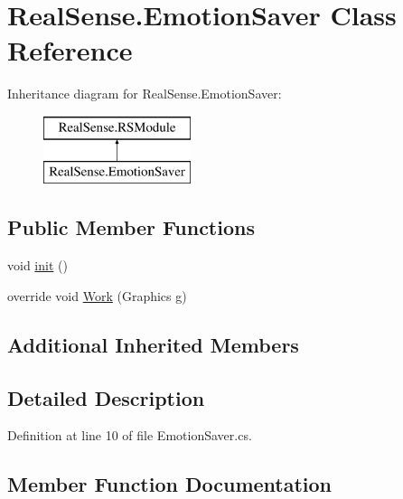 \hypertarget{class_real_sense_1_1_emotion_saver}{}\section{Real\+Sense.\+Emotion\+Saver Class Reference}
\label{class_real_sense_1_1_emotion_saver}
Inheritance diagram for Real\+Sense.\+Emotion\+Saver\+:\begin{figure}[H]
\begin{center}
\leavevmode
\includegraphics[height=2.000000cm]{class_real_sense_1_1_emotion_saver}
\end{center}
\end{figure}
\subsection*{Public Member Functions}
\begin{DoxyCompactItemize}
\item 
void \hyperlink{class_real_sense_1_1_emotion_saver_a82c46b76df032f49665606979b1170a4}{init} ()
\item 
override void \hyperlink{class_real_sense_1_1_emotion_saver_a168f0ff9ee4ba98187c88a2d33f537e8}{Work} (Graphics g)
\end{DoxyCompactItemize}
\subsection*{Additional Inherited Members}


\subsection{Detailed Description}


Definition at line 10 of file Emotion\+Saver.\+cs.



\subsection{Member Function Documentation}
\mbox{\label{class_real_sense_1_1_emotion_saver_a82c46b76df032f49665606979b1170a4}} 
